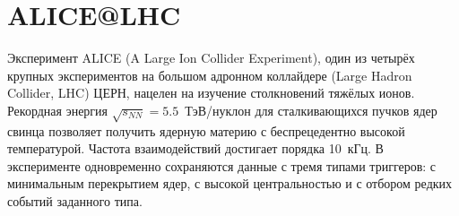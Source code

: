



\section{ALICE@LHC}

Эксперимент ALICE (A Large Ion Collider Experiment), один из четырёх крупных экспериментов на большом адронном коллайдере (Large Hadron Collider, LHC) ЦЕРН, нацелен на изучение столкновений тяжёлых ионов. Рекордная энергия $\sqrt{s_{NN}}=5.5$~\mbox{ТэВ/нуклон} для сталкивающихся пучков ядер свинца позволяет получить ядерную материю с беспрецедентно высокой температурой. Частота взаимодействий достигает порядка 10~кГц. В эксперименте одновременно сохраняются данные с тремя типами триггеров: с минимальным перекрытием ядер, с высокой центральностью и с отбором редких событий заданного типа.

